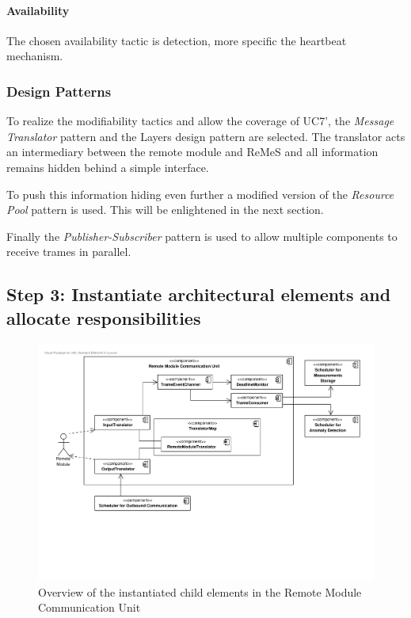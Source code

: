 \paragraph{Availability}

\npar The chosen availability tactic is detection, more specific the heartbeat
mechanism.

\subsubsection{Design Patterns}
\label{add:it2/patterns}

\npar To realize the modifiability tactics and allow the coverage of UC7', the
\emph{Message Translator} pattern \citep[see][p.~229]{Buschmann:07} and the
Layers design pattern \citep[see][p.~185]{Buschmann:07} are selected.
The translator acts an intermediary between the remote module and ReMeS and all
information remains hidden behind a simple interface.

\npar To push this information hiding even further a modified version of the
\emph{Resource Pool} pattern is used. This will be enlightened in the next
section.

\npar Finally the \emph{Publisher-Subscriber} pattern
\citep[see][p.~234]{Buschmann:07} is used to allow multiple components to
receive trames in parallel.

\subsection{Step 3: Instantiate architectural elements and allocate responsibilities}
\label{add:it2/elements}

\begin{figure}[H]
	\begin{centering}
		\includegraphics[width=\textwidth]{figs/add-it2-elements.pdf}
		\caption{Overview of the instantiated child elements in the Remote Module
		Communication Unit}
		\label{fig:it2/elements}
	\end{centering}
\end{figure}

